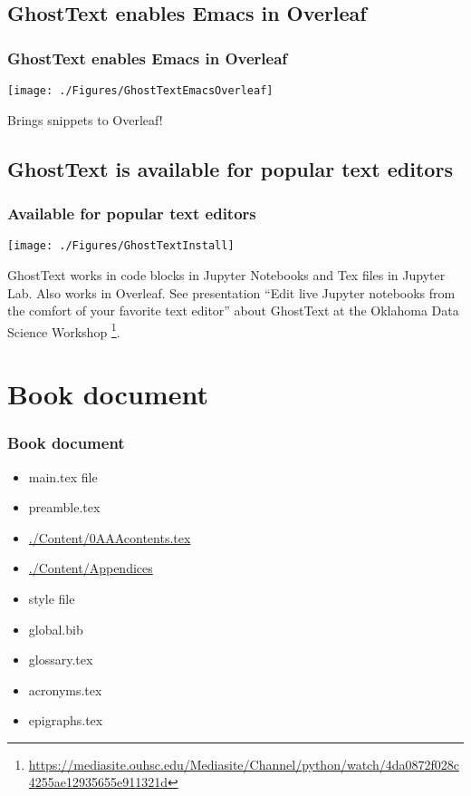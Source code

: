 \documentclass{beamer}
\begin{document}
\subsection{GhostText enables Emacs in Overleaf}
\begin{frame}
\frametitle{GhostText enables Emacs in Overleaf}
\begin{center}
    \texttt{[image: ./Figures/GhostTextEmacsOverleaf]}
\end{center}
Brings snippets to Overleaf!
\end{frame}


\subsection{GhostText is available for popular text editors}
\begin{frame}
\frametitle{Available for popular text editors}
\begin{center}
    \texttt{[image: ./Figures/GhostTextInstall]}
\end{center}
GhostText works in code blocks in Jupyter Notebooks and Tex files in Jupyter Lab. Also works in Overleaf. See presentation ``Edit live Jupyter notebooks from the comfort of your favorite text editor'' about GhostText at the Oklahoma Data Science Workshop  \footnote{\url{https://mediasite.ouhsc.edu/Mediasite/Channel/python/watch/4da0872f028c4255ae12935655e911321d}}.
\end{frame}


\section{Book document}
\begin{frame}
\frametitle{Book document}
\begin{center}
\begin{itemize}
\item main.tex file
\item preamble.tex
\item \url{./Content/0AAAcontents.tex}
\item \url{./Content/Appendices}
\item style file
\item global.bib
\item glossary.tex
\item acronyms.tex
\item epigraphs.tex
\end{itemize}
\end{center}
\end{frame}
\end{document}
